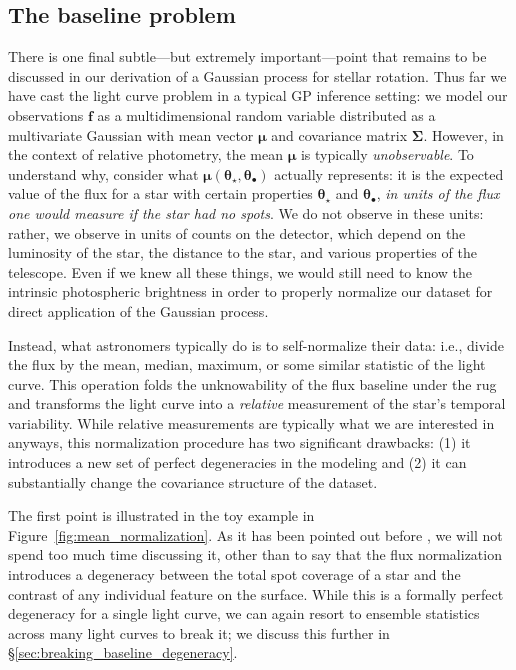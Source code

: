 \documentclass[modern]{aastex62}
\begin{document}
\subsection{The baseline problem}
\label{sec:baseline}

There is one final subtle---but extremely important---point that remains to
be discussed in our derivation of a Gaussian process for stellar
rotation. Thus far we have cast the light curve problem in a typical GP inference
setting: we model our observations $\mathbf{f}$ as
a multidimensional random variable distributed as a multivariate Gaussian with mean vector
$\pmb{\mu}$ and covariance matrix $\pmb{\Sigma}$. However, in the context of
relative photometry, the mean $\pmb{\mu}$ is typically \emph{unobservable}.
%
To understand why, consider what
$\pmb{\mu}(\pmb{\theta}_\star, \pmb{\theta}_\bullet)$ actually represents:
it is the expected value
of the flux
for a star with certain properties $\pmb{\theta}_\star$ and $\pmb{\theta}_\bullet$,
\emph{in units of the flux one would measure if the star had no spots}.
We do not observe in these units: rather, we observe in units of counts on
the detector, which depend on the luminosity of the star, the distance to
the star, and various properties of the telescope. Even if we knew all these
things, we would still need to know the intrinsic photospheric brightness
in order to properly normalize our dataset for direct application of
the Gaussian process.

Instead, what astronomers typically do is to self-normalize their data:
i.e., divide the flux by the mean, median, maximum, or some similar
statistic of the light curve. This operation folds the unknowability of
the flux baseline under the rug and transforms the light curve into a \emph{relative}
measurement of the star's temporal variability. While relative measurements
are typically what we are interested in anyways, this normalization procedure
has two significant drawbacks: (1) it introduces a new set of perfect degeneracies
in the modeling and (2) it can substantially change the covariance structure
of the dataset.

The first point is illustrated in the toy example in
Figure~\ref{fig:mean_normalization}. As it has been pointed out before ,
we will not spend too much time discussing it, other than to say that the
flux normalization introduces a degeneracy between the total spot coverage
of a star and the contrast of any individual feature on the surface.
While this is a formally perfect degeneracy for a single light curve, we can
again resort to ensemble statistics across many light curves to break it;
we discuss this further in \S\ref{sec:breaking_baseline_degeneracy}.
\end{document}
